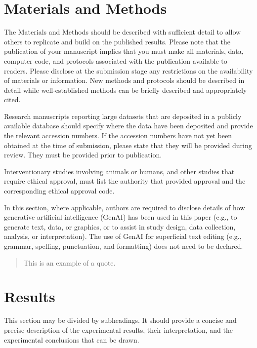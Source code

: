 \documentclass[journal,article,submit,moreauthors]{Definitions/mdpi}
\begin{document}
\section{Materials and Methods}

The Materials and Methods should be described with sufficient detail to allow others to replicate and build on the published results. Please note that the publication of your manuscript implies that you must make all materials, data, computer code, and protocols associated with the publication available to readers. Please disclose at the submission stage any restrictions on the availability of materials or information. New methods and protocols should be described in detail while well-established methods can be briefly described and appropriately cited.

Research manuscripts reporting large datasets that are deposited in a publicly available database should specify where the data have been deposited and provide the relevant accession numbers. If the accession numbers have not yet been obtained at the time of submission, please state that they will be provided during review. They must be provided prior to publication.

Interventionary studies involving animals or humans, and other studies that require ethical approval, must list the authority that provided approval and the corresponding ethical approval code.

In this section, where applicable, authors are required to disclose details of how generative artificial intelligence (GenAI) has been used in this paper (e.g., to generate text, data, or graphics, or to assist in study design, data collection, analysis, or interpretation). The use of GenAI for superficial text editing (e.g., grammar, spelling, punctuation, and formatting) does not need to be declared.

\begin{quote}
This is an example of a quote.
\end{quote}

\section{Results}

This section may be divided by subheadings. It should provide a concise and precise description of the experimental results, their interpretation, and the experimental conclusions that can be drawn.
\end{document}
